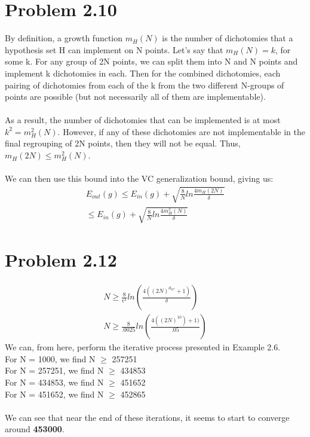 \documentclass[12pt]{article}
\begin{document}
\section*{Problem 2.10}
By definition, a growth function $m_H(N)$ is the number of dichotomies that a hypothesis set H can implement on N points. Let's say that $m_H(N) = k$, for some k. For any group of 2N points, we can split them into N and N points and implement k dichotomies in each. Then for the combined dichotomies, each pairing of dichotomies from each of the k from the two different N-groups of points are possible (but not necessarily all of them are implementable).
\\ \\ As a result, the number of dichotomies that can be implemented is at most $k^2 = m_H^2(N)$. However, if any of these dichotomies are not implementable in the final regrouping of 2N points, then they will not be equal. Thus, $m_H(2N) \le m_H^2(N)$.
\\ \\ We can then use this bound into the VC generalization bound, giving us:
\begin{gather*}
E_{out}(g) \le E_{in}(g) + \sqrt{\frac{8}{N}ln\frac{4m_H(2N)}{\delta}}
\\ \le E_{in}(g) + \sqrt{\frac{8}{N}ln\frac{4m_H^2(N)}{\delta}}
\end{gather*}

\section*{Problem 2.12}
\begin{gather*}
	N \ge \frac{8}{\epsilon^2} ln(\frac{4((2N)^{d_{VC}}+ 1)}{\delta})
	\\ N \ge \frac{8}{.0025} ln(\frac{4((2N)^{10}) + 1)}{.05})
\end{gather*}
We can, from here, perform the iterative process presented in Example 2.6.
\\ For N = 1000, we find N $\ge$ 257251
\\ For N = 257251, we find N $\ge$ 434853
\\ For N = 434853, we find N $\ge$ 451652
\\ For N = 451652, we find N $\ge$ 452865
\\ \\ We can see that near the end of these iterations, it seems to start to converge around \textbf{453000}.
\end{document}
